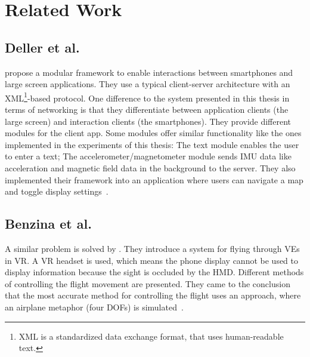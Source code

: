 \chapter{Related Work}\label{chapter:related-work}


\section{Deller et al.}\label{section:deller-2011}
\citeauthor{Deller.2011} propose a modular framework to enable interactions between smartphones and large screen applications. They use a typical client-server architecture with an XML\footnote{XML is a standardized data exchange format, that uses human-readable text.}-based protocol. One difference to the system presented in this thesis in terms of networking is that they differentiate between application clients (the large screen) and interaction clients (the smartphones). They provide different modules for the client app. Some modules offer similar functionality like the ones implemented in the experiments of this thesis: The text module enables the user to enter a text; The accelerometer/magnetometer module sends \ac{IMU} data like acceleration and magnetic field data in the background to the server. They also implemented their framework into an application where users can navigate a map and toggle display settings~\cite{Deller.2011}.


\section{Benzina et al.}\label{section:benzina-2011}
A similar problem is solved by \citeauthor{Benzina.2011}. They introduce a system for flying through \acp{VE} in \ac{VR}. A \ac{VR} headset is used, which means the phone display cannot be used to display information because the sight is occluded by the \ac{HMD}. Different methods of controlling the flight movement are presented. They came to the conclusion that the most accurate method for controlling the flight uses an approach, where an airplane metaphor (four \acp{DOF}) is simulated~\cite{Benzina.2011}.



